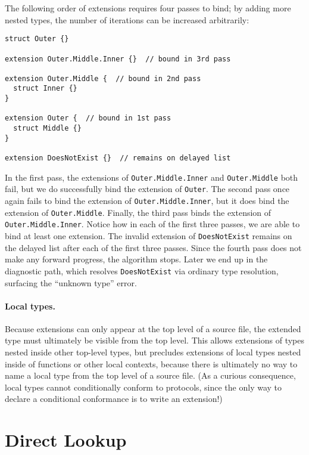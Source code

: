 \documentclass[../generics]{subfiles}
\begin{document}
\begin{example}
The following order of extensions requires four passes to bind; by adding more nested types, the number of iterations can be increased arbitrarily:
\begin{Verbatim}
struct Outer {}

extension Outer.Middle.Inner {}  // bound in 3rd pass

extension Outer.Middle {  // bound in 2nd pass
  struct Inner {}
}

extension Outer {  // bound in 1st pass
  struct Middle {}
}

extension DoesNotExist {}  // remains on delayed list
\end{Verbatim}

In the first pass, the extensions of \texttt{Outer.Middle.Inner} and \texttt{Outer.Middle} both fail, but we do successfully bind the extension of \texttt{Outer}. The second pass once again fails to bind the extension of \texttt{Outer.Middle.Inner}, but it does bind the extension of \texttt{Outer.Middle}. Finally, the third pass binds the extension of \texttt{Outer.Middle.Inner}. Notice how in each of the first three passes, we are able to bind at least one extension. The invalid extension of \texttt{DoesNotExist} remains on the delayed list after each of the first three passes. Since the fourth pass does not make any forward progress, the algorithm stops. Later we end up in the diagnostic path, which resolves \texttt{DoesNotExist} via ordinary type resolution, surfacing the ``unknown type'' error.
\end{example}

\paragraph{Local types.}
Because extensions can only appear at the top level of a source file, the extended type must ultimately be visible from the top level. This allows extensions of types nested inside other top-level types, but precludes extensions of local types nested inside of functions or other local contexts, because there is ultimately no way to name a local type from the top level of a source file. (As a curious consequence, local types cannot conditionally conform to protocols, since the only way to declare a conditional conformance is to write an extension!)

\section{Direct Lookup}\label{direct lookup}
\end{document}
